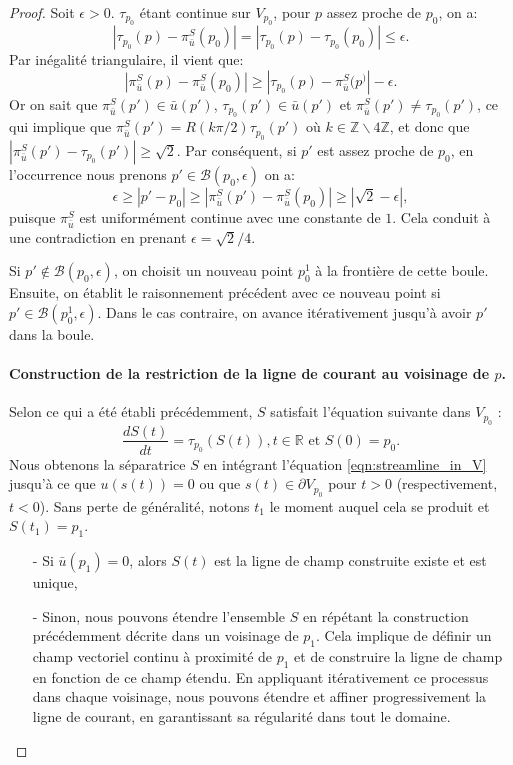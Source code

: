 \begin{proof}
Soit $\epsilon>0$. $\tau_{p_0}$ étant continue sur $V_{p_0}$, pour $p$ assez proche de $p_0$, on a:
$$|\tau_{p_0}(p)-\pi^S_{\bar{u}}(p_0)|=|\tau_{p_0}(p)-\tau_{p_0}(p_0)|\leq\epsilon.$$
Par inégalité triangulaire, il vient que:
$$|\pi^S_{\bar{u}}(p)-\pi^S_{\bar{u}}(p_0)|\geq|\tau_{p_0}(p)-\pi^S_{\bar{u}}(p^)|-\epsilon.$$
Or on sait que $\pi^S_{\bar{u}}(p')\in{\bar{u}}(p')$, $\tau_{p_0}(p')\in{\bar{u}}(p')$ et $\pi_{\bar{u}}^S(p')\neq\tau_{p_0}(p')$, ce qui implique que $\pi^S_{\bar{u}}(p')=R(k\pi/2)\tau_{p_0}(p')$ où $k\in\mathbb{Z}\backslash 4\mathbb{Z}$, et donc que $|\pi^S_{\bar{u}}(p')-\tau_{p_0}(p')|\geq\sqrt{2}$. Par conséquent, si $p'$ est assez proche de $p_0$, en l'occurrence nous prenons $p'\in\mathcal{B}(p_0,\epsilon)$ on a:
\[
\epsilon \geq |p' - p_0| \geq |\pi^S_{\bar{u}}(p') - \pi^S_{\bar{u}}(p_0)| \geq |\sqrt{2} - \epsilon|,
\]
puisque $\pi^S_{\bar{u}}$ est uniformément continue avec une constante de $1$. Cela conduit à une contradiction en prenant $\epsilon = \sqrt{2}/4$. %

Si $p' \notin \mathcal{B}(p_0, \epsilon)$, on choisit un nouveau point $p_0^1$ à la frontière de cette boule. Ensuite, on établit le raisonnement précédent avec ce nouveau point si $p' \in \mathcal{B}(p_0^1, \epsilon)$. Dans le cas contraire, on avance itérativement jusqu'à avoir $p'$ dans la boule.



\paragraph{Construction de la restriction de la ligne de courant au voisinage de $p$.}
Selon ce qui a été établi précédemment, $S$ satisfait l'équation suivante dans $V_{p_0}$ :\begin{equation}
\label{eqn:streamline_in_V}
\frac{dS(t)}{dt}=\tau_{p_0}(S(t)),t\in \mathbb{R} \text{ et }  S(0)=p_0.
\end{equation}
Nous obtenons la séparatrice $S$ en intégrant l'équation \eqref{eqn:streamline_in_V} jusqu'à ce que $u(s(t))=0$ ou que $s(t)\in\partial V_{p_0}$ pour $t>0$ (respectivement, $t<0$). Sans perte de généralité, notons $t_1$ le moment auquel cela se produit et $S(t_1)=p_1$.\\
\begin{itemize}
\item[-] Si $\bar{u}(p_1)=0$, alors $S(t)$ est la ligne de champ construite existe et est unique,\\
\item[-] Sinon, nous pouvons étendre l'ensemble $S$ en répétant la construction précédemment décrite dans un voisinage de $p_1$. Cela implique de définir un champ vectoriel continu à proximité de $p_1$ et de construire la ligne de champ en fonction de ce champ étendu. En appliquant itérativement ce processus dans chaque voisinage, nous pouvons étendre et affiner progressivement la ligne de courant, en garantissant sa régularité dans tout le domaine.
\end{itemize}
\end{proof}


